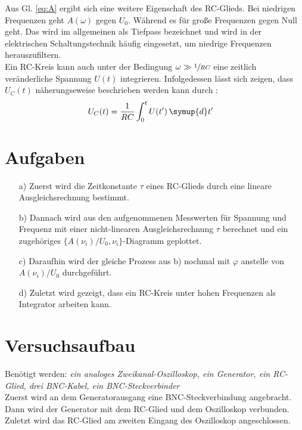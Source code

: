   Aus Gl. \eqref{eq:A} ergibt sich eine weitere Eigenschaft des RC-Glieds. Bei niedrigen 
  Frequenzen geht $A(\omega)$ gegen $U_0$. Während es für große Frequenzen
  gegen Null geht.
  Das wird im allgemeinen als Tiefpass bezeichnet und  wird in der 
  elektrischen Schaltungstechnik häufig eingesetzt, um niedrige Frequenzen
  herauszufiltern.\\
  Ein RC-Kreis kann auch unter der Bedingung $\omega \gg \sfrac{1}{RC}$ eine 
  zeitlich veränderliche Spannung $U(t)$ integrieren. Infolgedessen lässt sich 
  zeigen, dass $U_C(t)$ näherungseweise beschrieben werden kann durch \cite{V353}:
  \begin{align}
    U_C(t) &= \frac{1}{RC} \int_0^t{U(t') \, \symup{d}t'}
  \end{align}


\section{Aufgaben}\justifying

 \begin{enumerate}
    \item[a)] Zuerst wird die Zeitkonstante $\tau$ eines RC-Glieds durch 
              eine lineare Ausgleichsrechnung bestimmt.

    \item[b)] Dannach wird aus den aufgenommenen Messwerten für Spannung und 
              Frequenz mit einer nicht-linearen Ausgleichsrechnung $\tau$ berechnet 
              und ein zugehöriges $\{ A(\nu _i)/U_0,\nu _i \}$-Diagramm geplottet.
  
    \item[c)] Daraufhin wird der gleiche Prozess aus b) nochmal mit
              $\varphi$ anstelle von $A(\nu _i)/U_0$ durchgeführt.
  
    \item[d)] Zuletzt wird gezeigt, dass ein RC-Kreis unter hohen Frequenzen 
              als Integrator arbeiten kann.
  \end{enumerate}

  



\section{Versuchsaufbau}\justifying

Benötigt werden: \textit{ein analoges Zweikanal-Oszilloskop, ein Generator, ein RC-Glied, drei BNC-Kabel, ein BNC-Steckverbinder }\\
Zuerst wird an dem Generatorausgang eine BNC-Steckverbindung angebracht. 
Dann wird der Generator mit dem RC-Glied und dem Oszilloskop verbunden. \\
Zuletzt wird das RC-Glied am zweiten Eingang des Oszilloskop angeschlossen.

